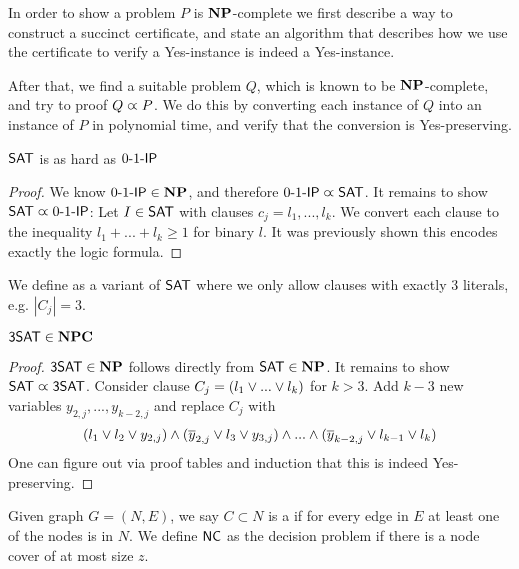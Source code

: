 \begin{strategy}
    In order to show a problem $P$ is $\mathbf{NP}$-complete we first describe a way to construct a succinct certificate,
    and state an algorithm that describes how we use the certificate to verify a Yes-instance is indeed a Yes-instance.

    After that, we find a suitable problem $Q$, which is known to be $\mathbf{NP}$-complete, and try to proof $Q \varpropto P$.
    We do this by converting each instance of $Q$ into an instance of $P$ in polynomial time, and verify that the conversion is Yes-preserving.
\end{strategy}

\begin{theorem}
    $\mathsf{SAT}$ is as hard as $\text{0-1-}\mathsf{IP}$
\end{theorem}
\begin{proof}
    We know $\text{0-1-}\mathsf{IP} \in \mathbf{NP}$, and therefore $\text{0-1-}\mathsf{IP} \varpropto \mathsf{SAT}$.
    It remains to show $\mathsf{SAT} \varpropto \text{0-1-}\mathsf{IP}$:
    Let $I \in \mathsf{SAT}$ with clauses $c_j={l_1,...,l_k}$. We convert each clause
    to the inequality $l_1+...+l_k\geq 1$ for binary $l$. It was previously shown this encodes exactly the
    logic formula. 
\end{proof}
\begin{definition}[$\TSAT$]
    We define  as a variant of $\mathsf{SAT}$ where we only allow clauses with exactly 3 literals, e.g. $|C_j|=3$.

\end{definition}
\begin{theorem}
    $\mathsf{3SAT} \in \mathbf{NPC}$
\end{theorem}
\begin{proof}
    $\mathsf{3SAT} \in \mathbf{NP}$ follows directly from $\mathsf{SAT} \in \mathbf{NP}$. It remains to show $\mathsf{SAT} \varpropto \mathsf{3SAT}$.
    Consider clause $C_j = (l_1 \vee ... \vee l_k)$ for $k > 3$. Add $k-3$ new variables
    $y_{2,j},...,y_{k-2,j}$ and replace $C_j$ with
    \begin{align*}
        (l_1 \vee l_2 \vee y_{2,j}) \wedge (\overline{y}_{2,j} \vee l_3 \vee y_{3,j}) \wedge ... \wedge (\overline{y}_{k-2,j} \vee l_{k-1} \vee l_k)
    \end{align*}
    One can figure out via proof tables and induction that this is indeed Yes-preserving.
\end{proof}
\begin{definition}
    Given graph $G = (N,E)$, we say $C \subset N$ is a 
    if for every edge in $E$ at least one of the nodes is in $N$.
    We define $\mathsf{NC}$ as the decision problem if there is a node cover of at most size $z$.
\end{definition}
